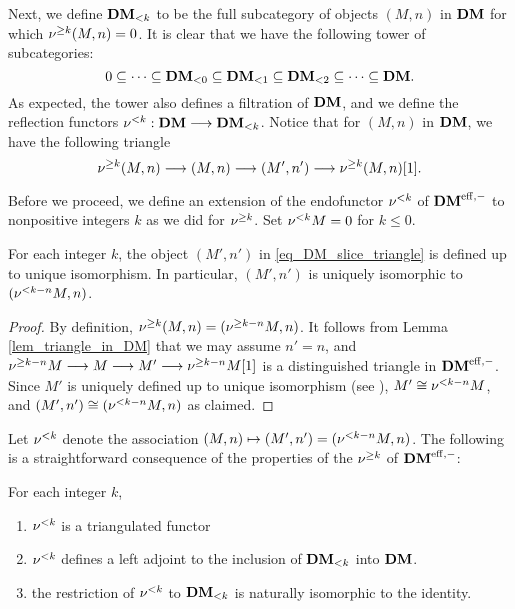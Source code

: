 Next, we define $\LFiltDM[k]{\DM}$ to be the full subcategory of 
objects $(M, n)$ in $\DM$ for which $\sgDM{k}(M, n) = 0$. It is
clear that we have the following tower of subcategories:
\begin{equation}\label{eq_DM_slice_cofilt}
0 \subseteq \cdots \subseteq \LFiltDM[0]{\DM} \subseteq 
   \LFiltDM[1]{\DM} \subseteq \LFiltDM[2]{\DM} \subseteq \cdots 
   \subseteq \DM.
\end{equation}
As expected, the tower also defines a filtration of $\DM$, and
we define the reflection functors $\slDM{k} : \DM \to 
\LFiltDM[k]{\DM}$. Notice that for $(M, n)$ in $\DM$, we have the 
following triangle
\begin{equation}\label{eq_DM_slice_triangle}
\sgDM{k} (M, n) \to (M, n) \to (M', n') \to \sgDM{k} (M, n)[1].
\end{equation}

Before we proceed, we define an extension of the endofunctor 
$\slDM{k}$ of $\DMeff$ to nonpositive integers $k$ as we did for 
$\sgDM{k}$. Set $\slDM{k} M = 0$ for $k \leq 0$.

\begin{lem}
For each integer $k$, the object $(M', n')$ in 
\eqref{eq_DM_slice_triangle} is defined up to unique isomorphism.
In particular, $(M', n')$ is uniquely isomorphic to 
$(\slDM{k - n} M, n)$.
\end{lem}
\begin{proof}
By definition, $\sgDM{k}(M, n) = (\sgDM{k - n}M, n)$. It follows 
from Lemma \ref{lem_triangle_in_DM} that we may assume $n' = n$,
and $\sgDM{k - n} M \to M \to M' \to \sgDM{k - n}M[1]$ is a 
distinguished triangle in $\DMeff$. Since $M'$ is uniquely defined 
up to unique isomorphism (see \cite[1.3(i)]{HuKa}), $M' \cong 
\slDM{k - n} M$, and $(M', n') \cong (\slDM{k - n}M, n)$ as 
claimed.
\end{proof}

Let $\slDM{k}$ denote the association $(M, n) \mapsto (M', n') =
(\slDM{k - n}M, n)$. The following is a straightforward consequence
of the properties of the $\sgDM{k}$ of $\DMeff$:

\begin{prop}\label{prop_slDM_functor}
For each integer $k$,
\begin{enumerate}
\item $\slDM{k}$ is a triangulated functor

\item $\slDM{k}$ defines a left adjoint to the inclusion of 
$\LFiltDM[k]{\DM}$ into $\DM$.

\item the restriction of $\slDM{k}$ to $\LFiltDM[k]{\DM}$ is naturally
isomorphic to the identity.
\end{enumerate}
\end{prop}


